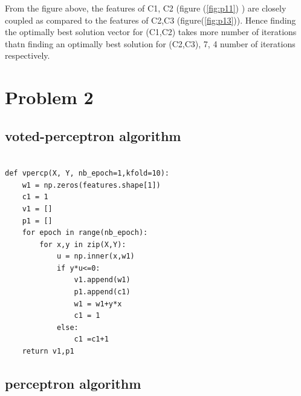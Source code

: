 \documentclass[10pt,a4paper]{article}
\begin{document}
From the figure above, the features of C1, C2 (figure (\ref{fig:p11}) ) are closely coupled as compared to the features of C2,C3 (figure(\ref{fig:p13})).
Hence finding the optimally best solution vector for (C1,C2) takes more number of iterations thatn finding an optimally best solution for (C2,C3), 7, 4 number of iterations respectively.

\vfill

\section{Problem 2}
\subsection*{voted-perceptron algorithm}

\lstset{%
basicstyle=\small, %
identifierstyle=, %
stringstyle=\ttfamily, %
showstringspaces=false} %

\lstset{language=Python}          %

\begin{lstlisting}[label=vperceptron,caption=Voted-Perceptron]  % Start your code-block

def vpercp(X, Y, nb_epoch=1,kfold=10):
    w1 = np.zeros(features.shape[1])
    c1 = 1
    v1 = []
    p1 = []    
    for epoch in range(nb_epoch):
        for x,y in zip(X,Y):
            u = np.inner(x,w1)
            if y*u<=0:
                v1.append(w1)
                p1.append(c1)
                w1 = w1+y*x
                c1 = 1
            else:
                c1 =c1+1
    return v1,p1
\end{lstlisting}
\vfill
\subsection*{perceptron algorithm}

\lstset{%
basicstyle=\small, %
identifierstyle=, %
stringstyle=\ttfamily, %
showstringspaces=false} %
\end{document}
